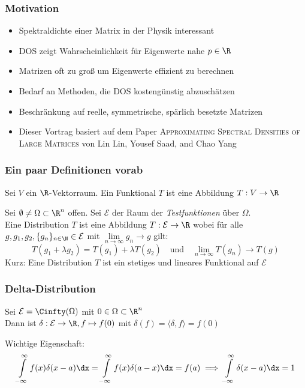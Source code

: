 \begin{frame}
    \frametitle{Motivation}
    \begin{itemize}
        \pause
        \item Spektraldichte einer Matrix in der Physik interessant
        \pause
        \item DOS zeigt Wahrscheinlichkeit für Eigenwerte nahe $p \in \R$
        \pause
        \item Matrizen oft zu groß um Eigenwerte effizient zu berechnen
        \pause
        \item Bedarf an Methoden, die DOS kostengünstig abzuschätzen
        \pause
        \item Beschränkung auf reelle, symmetrische, spärlich besetzte Matrizen
        \pause
        \item Dieser Vortrag basiert auf dem Paper \textsc{Approximating Spectral Densities of Large Matrices} von Lin Lin, Yousef Saad, and Chao Yang 
    \end{itemize}
\end{frame}

\begin{frame}
    \frametitle{Ein paar Definitionen vorab}
    \pause
    \begin{definition}[Funktional]
        Sei $V$ ein $\R$-Vektorraum. Ein Funktional $T$ ist eine Abbildung $T: V \to \R$
    \end{definition}
    \pause
    \begin{definition}[Distribution]
        Sei $\emptyset \neq \Omega \subset \R^n$ offen. Sei $\mathcal{E}$ der Raum der \emph{Testfunktionen} über $\Omega$.\\
        Eine Distribution $T$ ist eine Abbildung $T: \mathcal{E} \to \R$ wobei für alle $g, g_1, g_2, \{g_n\}_{n \in \N} \in \mathcal{E}$
        mit $\lim\limits_{n \to \infty} g_n \to g$ gilt:
        $$T(g_1 + \lambda g_2) = T(g_1) + \lambda T(g_2) \quad \text{und}\quad \lim\limits_{n \to \infty} T(g_n) \to T(g)$$
        Kurz: Eine Distribution $T$ ist ein stetiges und lineares Funktional auf $\mathcal{E}$
    \end{definition}
\end{frame}

\begin{frame}
    \frametitle{Delta-Distribution}
    \pause
    \begin{definition} 
        Sei $\mathcal{E} = \Cinfty(\Omega)$ mit $0 \in \Omega \subset \R^n$\\
        Dann ist $\delta: \mathcal{E} \to \R, f \mapsto f(0)$ mit $\delta(f) = \langle \delta, f \rangle = f(0)$\\
    \end{definition}
    \pause
    \vspace{5mm}
    Wichtige Eigenschaft:
    $$\int\limits_{-\infty}^{\infty} f(x) \delta(x-a) \dx = \int\limits_{-\infty}^{\infty} f(x) \delta(a-x) \dx = f(a) \implies \int\limits_{-\infty}^{\infty} \delta(x-a) \dx = 1$$
\end{frame}

